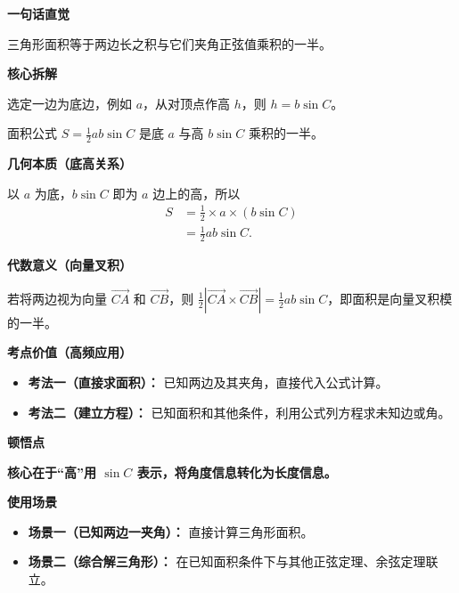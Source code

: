 \begin{explanationbox}
	\textbf{\textcolor{CExplanation}{一句话直觉}}

	三角形面积等于两边长之积与它们夹角正弦值乘积的一半。

	\medskip
	\textbf{\textcolor{CExplanation}{核心拆解}}
	\begin{description}[style=nextline, leftmargin=2.8em, labelsep=0.5em, itemsep=0.45em]
		\item[\textbf{要点一（几何构造）：}] 选定一边为底边，例如 $a$，从对顶点作高 $h$，则 $h = b\sin C$。
		\item[\textbf{要点二（公式结构）：}] 面积公式 $S = \frac{1}{2}ab\sin C$ 是底 $a$ 与高 $b\sin C$ 乘积的一半。
	\end{description}

	\medskip
	\textbf{\textcolor{CExplanation}{几何本质（底高关系）}}

	以 $a$ 为底，$b\sin C$ 即为 $a$ 边上的高，所以
	\[
		\begin{aligned}
			S &= \frac12 \times a \times (b\sin C) \\
			&= \frac12 ab\sin C .
		\end{aligned}
	\]

	\medskip
	\textbf{\textcolor{CExplanation}{代数意义（向量叉积）}}

	若将两边视为向量 $\overrightarrow{CA}$ 和 $\overrightarrow{CB}$，则 $\frac12 |\overrightarrow{CA} \times \overrightarrow{CB}| = \frac12 ab\sin C$，即面积是向量叉积模的一半。

	\medskip
	\textbf{\textcolor{CExplanation}{考点价值（高频应用）}}
	\begin{itemize}[leftmargin=*, itemsep=0.5em, topsep=0.4em]
		\item \textbf{考法一（直接求面积）：} 已知两边及其夹角，直接代入公式计算。
		\item \textbf{考法二（建立方程）：} 已知面积和其他条件，利用公式列方程求未知边或角。
	\end{itemize}

	\medskip
	\textbf{\textcolor{CExplanation}{顿悟点}}

	\textbf{核心在于“高”用 $\sin C$ 表示，将角度信息转化为长度信息。}

	\medskip
	\textbf{\textcolor{CExplanation}{使用场景}}
	\begin{itemize}[leftmargin=*, itemsep=0.5em, topsep=0.4em]
		\item \textbf{场景一（已知两边一夹角）：} 直接计算三角形面积。
		\item \textbf{场景二（综合解三角形）：} 在已知面积条件下与其他正弦定理、余弦定理联立。
	\end{itemize}
\end{explanationbox}
